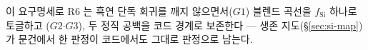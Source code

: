 이 요구명세로 R6 는 흑연 단독 회귀를 깨지 않으면서($G1$) 블렌드 곡선을 $f_\mathrm{Si}$ 하나로 토글하고
($G2$$\cdot$$G3$), 두 정직 공백을 코드 경계로 보존한다 --- 생존 지도(\S\ref{sec:si-map})가 문건에서
한 판정이 코드에서도 그대로 판정으로 남는다.

